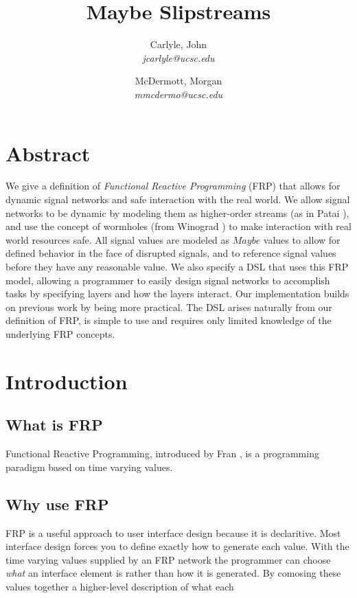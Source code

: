 \documentclass[twocolumn,11pt,english]{article}
\title{Maybe Slipstreams}
\date{}
\author{
  Carlyle, John\\
  \textit{jcarlyle@ucsc.edu}
  \and
  McDermott, Morgan\\
  \textit{mmcdermo@ucsc.edu}
}
\begin{document}
\maketitle

\section{Abstract}
We give a definition of \textit{Functional Reactive Programming} (FRP) that allows for dynamic signal networks and safe interaction with the real world. We allow signal networks to be dynamic by modeling them as higher-order streams (as in Patai \cite{HighOrderStreams}), and use the concept of wormholes (from Winograd \cite{WinogradCort2012HS}) to make interaction with real world resources safe. All signal values are modeled as $Maybe$ values to allow for defined behavior in the face of disrupted signals, and to reference signal values before they have any reasonable value. We also specify a DSL that uses this FRP model, allowing a programmer to easily design signal networks to accomplish tasks by specifying layers and how the layers interact. Our implementation builds on previous work by being more practical. The DSL arises naturally from our definition of FRP, is simple to use and requires only limited knowledge of the underlying FRP concepts.

\section{Introduction}
\subsection{What is FRP}
Functional Reactive Programming, introduced by Fran \cite{ElliottHudak97:Fran}, is a programming paradigm based on time varying values.

\subsection{Why use FRP}
FRP is a useful approach to user interface design because it is declaritive. Most interface design forces you to define exactly how to generate each value. With the time varying values supplied by an FRP network the programmer can choose \textit{what} an interface element is rather than how it is generated. By comosing these values together a higher-level description of what each 
\end{document}
